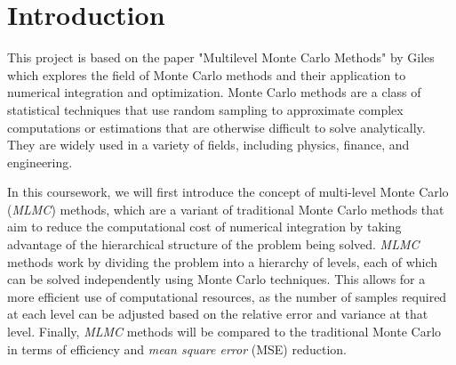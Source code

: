 \section{Introduction}

This project is based on the paper "Multilevel Monte Carlo Methods" by Giles \cite{giles_2015} which explores the field of Monte Carlo methods and their application to numerical integration and optimization. Monte Carlo methods are a class of statistical techniques that use random sampling to approximate complex computations or estimations that are otherwise difficult to solve analytically. They are widely used in a variety of fields, including physics, finance, and engineering.

In this coursework, we will first introduce the concept of multi-level Monte Carlo (\textit{MLMC}) methods, which are a variant of traditional Monte Carlo methods that aim to reduce the computational cost of numerical integration by taking advantage of the hierarchical structure of the problem being solved. \textit{MLMC} methods work by dividing the problem into a hierarchy of levels, each of which can be solved independently using Monte Carlo techniques. This allows for a more efficient use of computational resources, as the number of samples required at each level can be adjusted based on the relative error and variance at that level.
Finally, \textit{MLMC} methods will be compared to the traditional Monte Carlo in terms of efficiency and \textit{mean square error} (MSE) reduction.
